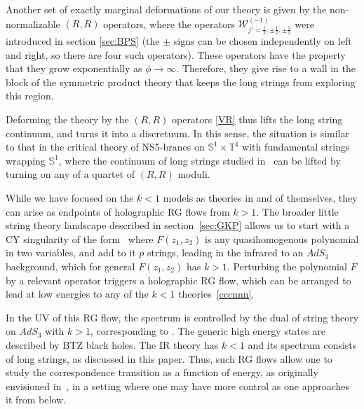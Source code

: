 \documentclass[12pt]{article}
\def\half{\frac12}
\newcommand{\bS}{{\mathbb S}}
\newcommand{\bT}{{\mathbb T}}
\numberwithin{equation}{section}
\def\cG{\mathcal {G}} \def\cH{\mathcal {H}} \def\cI{\mathcal {I}}
\def\cV{\mathcal {V}} \def\cW{\mathcal {W}} \def\cX{\mathcal {X}}
\def\half{\frac12}
\begin{document}
Another set of exactly marginal deformations of our theory is given by the  non-normalizable $(\!R,\!R)$ operators,
\eqn[VR]{
\cV_R^{\pm\pm} = \cG^\mp_{-\half}\bar\cG^\mp_{-\half}\cW_{j'=\half;\pm\half,\pm\half}^{(-1)}~,
}
where the operators $\cW_{j'=\half;\pm\half,\pm\half}^{(-1)}$ were introduced in section \ref{sec:BPS} (the $\pm$ signs can be chosen independently on left and right, so there are four such operators). These operators have the property that they grow exponentially as $\phi\to\infty$. Therefore, they give rise to a wall in the block of the symmetric product theory that keeps the long strings from exploring this region. 


Deforming the theory by the $(\!R,\!R)$ operators \eqref{VR} thus lifts the long string continuum, and turns it into a discretuum. In this sense, the situation is similar to that in the critical theory of NS5-branes on $\bS^1\times \bT^4$ with fundamental strings wrapping $\bS^1$, where the continuum of long strings studied in~ can be lifted by turning on any of a quartet of $(\!R,\!R)$ moduli. 




While we have focused on the $k<1$ models as theories in and of themselves, they can arise as endpoints of holographic RG flows from $k>1$.  The broader little string theory landscape described in section~\ref{sec:GKP} allows us to start with a CY singularity of the form~
where $F(z_1,z_2)$ is any quasihomogenous polynomial in two variables, and add to it $p$ strings, leading in the infrared to an $AdS_3$ background, which for general $F(z_1,z_2)$ has $k>1$.  Perturbing the polynomial $F$ by a relevant operator triggers a holographic RG flow, which can be arranged to lead at low energies to any of the $k<1$ theories~\eqref{cccnnn}.  

In the UV of this RG flow, the spectrum is controlled by the dual of string theory on $AdS_3$ with $k>1$, corresponding to \UVsing. The generic high energy states are described by BTZ black holes. The IR theory has $k<1$ and its spectrum consists of long strings, as discussed in this paper. Thus, such RG flows allow one to study the correspondence transition as a function of energy, as originally envisioned in~, in a setting where one may have more control as one approaches it from below.
\end{document}
